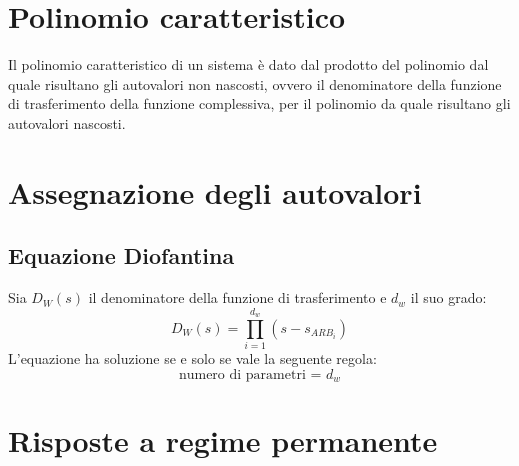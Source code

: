 \documentclass{report}
\theoremstyle{nostyle}
\begin{document}
\section{Polinomio caratteristico}
Il polinomio caratteristico di un sistema è dato dal prodotto del polinomio dal quale risultano gli autovalori non nascosti, ovvero il denominatore della funzione di trasferimento della funzione complessiva, per il polinomio
da quale risultano gli autovalori nascosti.



\section{Assegnazione degli autovalori}
\subsection{Equazione Diofantina}
Sia $D_W(s)$ il denominatore della funzione di trasferimento e $d_w$ il suo grado:
\[    D_W (s) = \prod_{i = 1}^{d_w} (s-s_{ARB_i})      \]
L'equazione ha soluzione se e solo se vale la seguente regola:
\[  \text{numero di parametri = } d_w\]





\section{Risposte a regime permanente}
\end{document}
